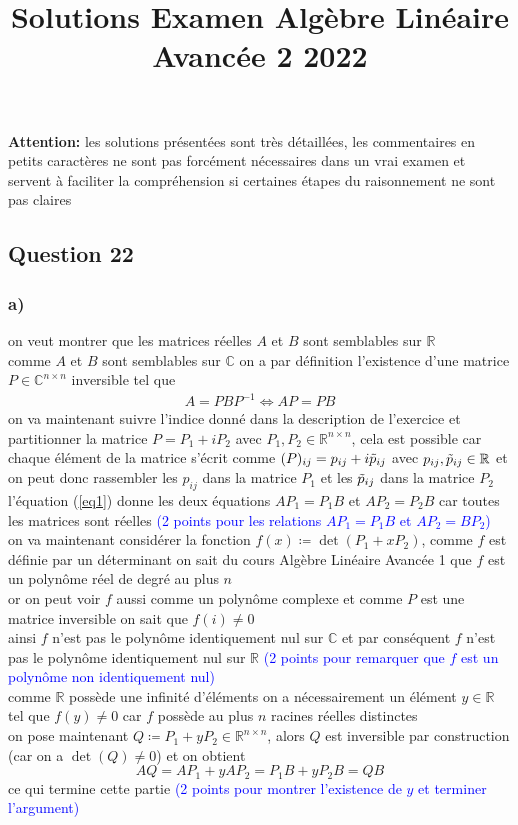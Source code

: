 \documentclass[11pt, a4paper, oneside]{article}
\begin{document}
\title{Solutions Examen Algèbre Linéaire Avancée 2 2022}
\maketitle

\textbf{Attention:} les solutions présentées sont très détaillées, les commentaires en {\tiny petits caractères} ne sont pas forcément nécessaires dans un vrai examen et servent à faciliter la compréhension si certaines étapes du raisonnement ne sont pas claires

\subsection*{Question 22}
\subsubsection*{a)}
on veut montrer que les matrices réelles $A$ et $B$ sont semblables sur $\mathbb{R}$ \\
comme $A$ et $B$ sont semblables sur $\mathbb{C}$ on a par définition l'existence d'une matrice $P \in \mathbb{C}^{n \times n}$ inversible tel que
\begin{align}
\label{eq1}
A = PBP^{-1} \Longleftrightarrow AP = PB
\end{align}
on va maintenant suivre l'indice donné dans la description de l'exercice et partitionner la matrice $P=P_1 + i P_2$ avec $P_1,P_2 \in \mathbb{R}^{n \times n}$, {\tiny cela est possible car chaque élément de la matrice s'écrit comme $(P)_{ij} = p_{ij} + i\Tilde{p}_{ij}$ avec $p_{ij},\Tilde{p}_{ij} \in \mathbb{R}$ et on peut donc rassembler les $p_{ij}$ dans la matrice $P_1$ et les $\Tilde{p}_{ij}$ dans la matrice $P_2$} \\
l'équation (\ref{eq1}) donne les deux équations $AP_1=P_1B$ et $AP_2=P_2B$ car toutes les matrices sont réelles \textcolor{blue}{(2 points pour les relations $AP_1 = P_1B$ et $AP_2 = BP_2$)}\\
on va maintenant considérer la fonction $f(x) \coloneqq \det(P_1 + xP_2)$, comme $f$ est définie par un déterminant on sait du cours Algèbre Linéaire Avancée 1 que $f$ est un polynôme réel de degré au plus $n$ \\
{\tiny or on peut voir $f$ aussi comme un polynôme complexe et comme $P$ est une matrice inversible on sait que $f(i) \neq 0$} \\
ainsi $f$ n'est pas le polynôme identiquement nul sur $\mathbb{C}$ et par conséquent $f$ n'est pas le polynôme identiquement nul sur $\mathbb{R}$ \textcolor{blue}{(2 points pour remarquer que $f$ est un polynôme non identiquement nul)} \\
{\tiny comme $\mathbb{R}$ possède une infinité d'éléments} on a nécessairement un élément $y \in \mathbb{R}$ tel que $f(y) \neq 0$ car $f$ possède au plus $n$ racines réelles distinctes \\
on pose maintenant $Q \coloneqq P_1 + yP_2 \in \mathbb{R}^{n \times n}$, alors $Q$ est inversible par construction {\tiny(car on a $\det(Q) \neq 0$)} et on obtient
$$AQ = AP_1 + yAP_2 = P_1B + yP_2B = QB$$ 
ce qui termine cette partie \textcolor{blue}{(2 points pour montrer l'existence de $y$ et terminer l'argument)}
\end{document}
